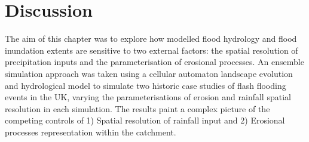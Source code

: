 \section{Discussion}

The aim of this chapter was to explore how modelled flood hydrology and flood inundation extents are sensitive to two external factors: the spatial resolution of precipitation inputs and the parameterisation of erosional processes. An ensemble simulation approach was taken using a cellular automaton landscape evolution and hydrological model to simulate two historic case studies of flash flooding events in the UK, varying the parameterisations of erosion and rainfall spatial resolution in each simulation. The results paint a complex picture of the competing controls of 1) Spatial resolution of rainfall input and 2) Erosional processes representation within the catchment.

